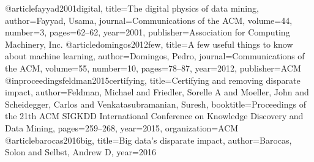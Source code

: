 @article{fayyad2001digital,
  title={The digital physics of data mining},
  author={Fayyad, Usama},
  journal={Communications of the ACM},
  volume={44},
  number={3},
  pages={62--62},
  year={2001},
  publisher={Association for Computing Machinery, Inc.}
}
@article{domingos2012few,
  title={A few useful things to know about machine learning},
  author={Domingos, Pedro},
  journal={Communications of the ACM},
  volume={55},
  number={10},
  pages={78--87},
  year={2012},
  publisher={ACM}
}
@inproceedings{feldman2015certifying,
  title={Certifying and removing disparate impact},
  author={Feldman, Michael and Friedler, Sorelle A and Moeller, John and Scheidegger, Carlos and Venkatasubramanian, Suresh},
  booktitle={Proceedings of the 21th ACM SIGKDD International Conference on Knowledge Discovery and Data Mining},
  pages={259--268},
  year={2015},
  organization={ACM}
}
@article{barocas2016big,
  title={Big data's disparate impact},
  author={Barocas, Solon and Selbst, Andrew D},
  year={2016}
}







